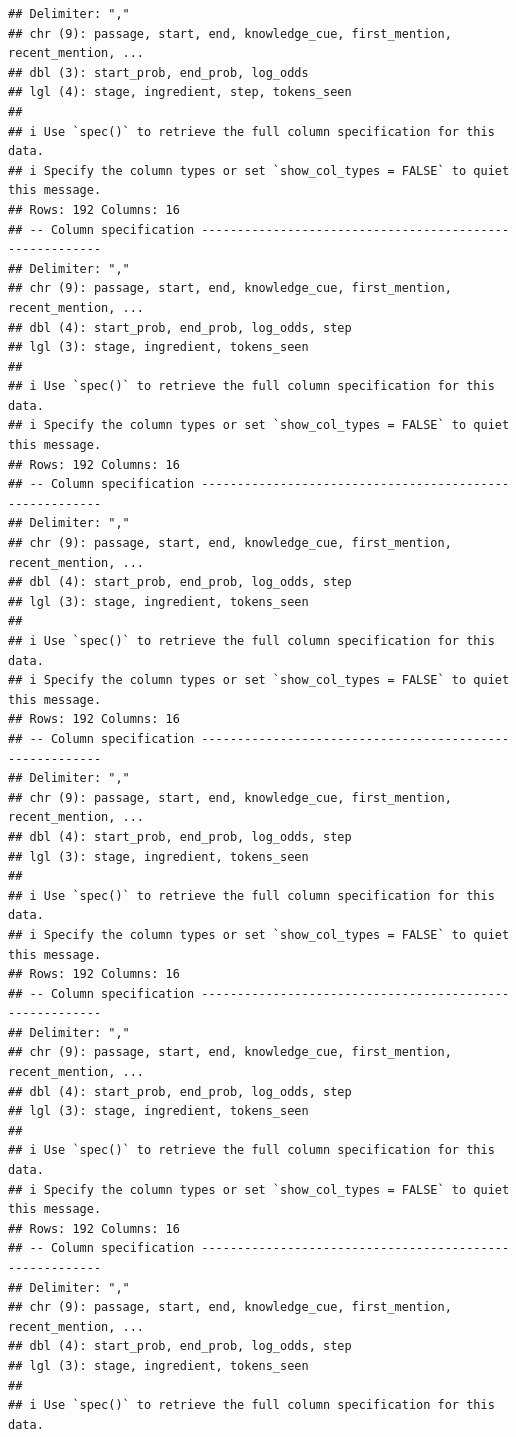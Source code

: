 \documentclass[
]{article}
\begin{document}
\begin{verbatim}
## Delimiter: ","
## chr (9): passage, start, end, knowledge_cue, first_mention, recent_mention, ...
## dbl (3): start_prob, end_prob, log_odds
## lgl (4): stage, ingredient, step, tokens_seen
## 
## i Use `spec()` to retrieve the full column specification for this data.
## i Specify the column types or set `show_col_types = FALSE` to quiet this message.
## Rows: 192 Columns: 16
## -- Column specification --------------------------------------------------------
## Delimiter: ","
## chr (9): passage, start, end, knowledge_cue, first_mention, recent_mention, ...
## dbl (4): start_prob, end_prob, log_odds, step
## lgl (3): stage, ingredient, tokens_seen
## 
## i Use `spec()` to retrieve the full column specification for this data.
## i Specify the column types or set `show_col_types = FALSE` to quiet this message.
## Rows: 192 Columns: 16
## -- Column specification --------------------------------------------------------
## Delimiter: ","
## chr (9): passage, start, end, knowledge_cue, first_mention, recent_mention, ...
## dbl (4): start_prob, end_prob, log_odds, step
## lgl (3): stage, ingredient, tokens_seen
## 
## i Use `spec()` to retrieve the full column specification for this data.
## i Specify the column types or set `show_col_types = FALSE` to quiet this message.
## Rows: 192 Columns: 16
## -- Column specification --------------------------------------------------------
## Delimiter: ","
## chr (9): passage, start, end, knowledge_cue, first_mention, recent_mention, ...
## dbl (4): start_prob, end_prob, log_odds, step
## lgl (3): stage, ingredient, tokens_seen
## 
## i Use `spec()` to retrieve the full column specification for this data.
## i Specify the column types or set `show_col_types = FALSE` to quiet this message.
## Rows: 192 Columns: 16
## -- Column specification --------------------------------------------------------
## Delimiter: ","
## chr (9): passage, start, end, knowledge_cue, first_mention, recent_mention, ...
## dbl (4): start_prob, end_prob, log_odds, step
## lgl (3): stage, ingredient, tokens_seen
## 
## i Use `spec()` to retrieve the full column specification for this data.
## i Specify the column types or set `show_col_types = FALSE` to quiet this message.
## Rows: 192 Columns: 16
## -- Column specification --------------------------------------------------------
## Delimiter: ","
## chr (9): passage, start, end, knowledge_cue, first_mention, recent_mention, ...
## dbl (4): start_prob, end_prob, log_odds, step
## lgl (3): stage, ingredient, tokens_seen
## 
## i Use `spec()` to retrieve the full column specification for this data.

\end{verbatim}
\end{document}
